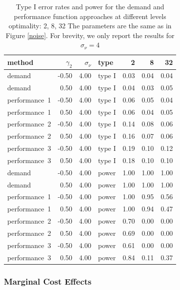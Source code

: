 \documentclass[12pt]{article}
\begin{document}
\begin{table}[ht]
\centering
\begingroup\footnotesize
\begin{tabular}{lrrlrrr}
  \hline
method & $\gamma_2$ & $\sigma_{\nu}$ & type & 2 & 8 & 32 \\
  \hline
demand & -0.50 & 4.00 & type I & 0.03 & 0.04 & 0.04 \\
  demand & 0.50 & 4.00 & type I & 0.04 & 0.03 & 0.05 \\
  performance~1 & -0.50 & 4.00 & type I & 0.06 & 0.05 & 0.04 \\
  performance~1 & 0.50 & 4.00 & type I & 0.06 & 0.04 & 0.05 \\
  performance~2 & -0.50 & 4.00 & type I & 0.14 & 0.08 & 0.06 \\
  performance~2 & 0.50 & 4.00 & type I & 0.16 & 0.07 & 0.06 \\
  performance~3 & -0.50 & 4.00 & type I & 0.19 & 0.10 & 0.12 \\
  performance~3 & 0.50 & 4.00 & type I & 0.18 & 0.10 & 0.10 \\
  demand & -0.50 & 4.00 & power & 1.00 & 1.00 & 1.00 \\
  demand & 0.50 & 4.00 & power & 1.00 & 1.00 & 1.00 \\
  performance~1 & -0.50 & 4.00 & power & 1.00 & 0.95 & 0.56 \\
  performance~1 & 0.50 & 4.00 & power & 1.00 & 0.94 & 0.47 \\
  performance~2 & -0.50 & 4.00 & power & 0.70 & 0.00 & 0.00 \\
  performance~2 & 0.50 & 4.00 & power & 0.69 & 0.00 & 0.00 \\
  performance~3 & -0.50 & 4.00 & power & 0.61 & 0.00 & 0.00 \\
  performance~3 & 0.50 & 4.00 & power & 0.84 & 0.11 & 0.37 \\
   \hline
\end{tabular}
\endgroup
\caption[Error Rate and Power with Increasing Levels of Variability in Performance]{Type I error rates and power for the demand and
performance function approaches at different levels optimality: 2, 8, 32 The
parameters are the same as in Figure \ref{noise}. For brevity, we only report the
results for $\sigma_{\nu} = 4$}
\label{noise-error}
\end{table}

\subsubsection{Marginal Cost Effects}\label{marginal-cost-effects}
\end{document}
